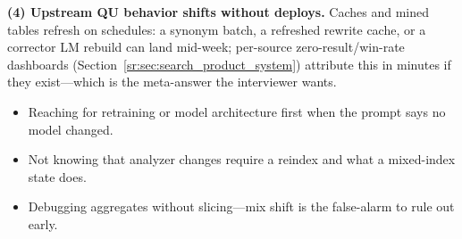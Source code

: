 \begin{interviewq}
\textbf{(4) Upstream QU behavior shifts without deploys.} Caches and mined tables refresh on schedules: a synonym batch, a refreshed rewrite cache, or a corrector LM rebuild can land mid-week; per-source zero-result/win-rate dashboards (Section~\ref{sr:sec:search_product_system}) attribute this in minutes if they exist---which is the meta-answer the interviewer wants.

\redflags
\begin{itemize}
    \item Reaching for retraining or model architecture first when the prompt says no model changed.
    \item Not knowing that analyzer changes require a reindex and what a mixed-index state does.
    \item Debugging aggregates without slicing---mix shift is the false-alarm to rule out early.
\end{itemize}


\end{interviewq}


